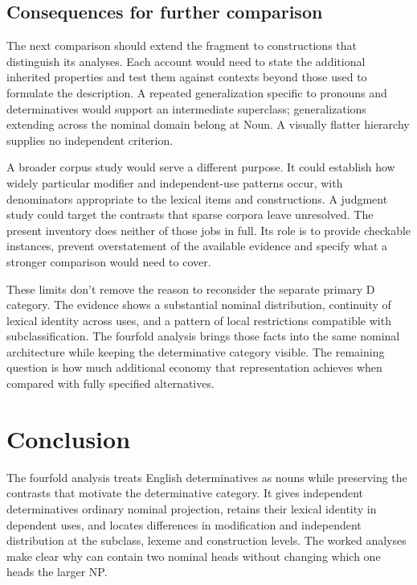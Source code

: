 \documentclass[12pt]{article}
\begin{document}
\subsection{Consequences for further comparison}

The next comparison should extend the fragment to constructions that distinguish its analyses. Each account would need to state the additional inherited properties and test them against contexts beyond those used to formulate the description. A repeated generalization specific to pronouns and determinatives would support an intermediate superclass; generalizations extending across the nominal domain belong at Noun. A visually flatter hierarchy supplies no independent criterion.

A broader corpus study would serve a different purpose. It could establish how widely particular modifier and independent-use patterns occur, with denominators appropriate to the lexical items and constructions. A judgment study could target the contrasts that sparse corpora leave unresolved. The present inventory does neither of those jobs in full. Its role is to provide checkable instances, prevent overstatement of the available evidence and specify what a stronger comparison would need to cover.

These limits don't remove the reason to reconsider the separate primary D category. The evidence shows a substantial nominal distribution, continuity of lexical identity across uses, and a pattern of local restrictions compatible with subclassification. The fourfold analysis brings those facts into the same nominal architecture while keeping the determinative category visible. The remaining question is how much additional economy that representation achieves when compared with fully specified alternatives.

\section{Conclusion}\label{sec:conclusion}

The fourfold analysis treats English determinatives as nouns while preserving the contrasts that motivate the determinative category. It gives independent determinatives ordinary nominal projection, retains their lexical identity in dependent uses, and locates differences in modification and independent distribution at the subclass, lexeme and construction levels. The worked analyses make clear why  can contain two nominal heads without changing which one heads the larger NP.
\end{document}
